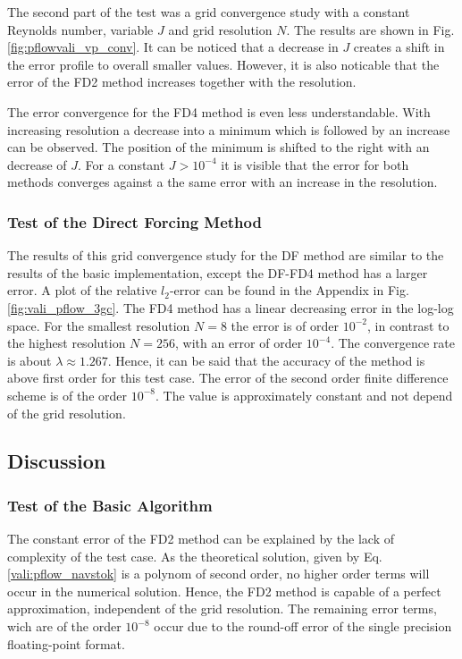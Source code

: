 The second part of the test was a grid convergence study with a constant Reynolds number, variable $J$ and grid resolution $N$.
The results are shown in Fig. \ref{fig:pflowvali_vp_conv}.
It can be noticed that a decrease in $J$ creates a shift in the error profile to overall smaller values.
However, it is also noticable that the error of the FD2 method increases together with the resolution.

The error convergence for the FD4 method is even less understandable.
With increasing resolution  a decrease into a minimum which is followed by an increase can be observed.
The position of the minimum is shifted to the right with an decrease of $J$.
For a constant $J>10^{-4}$ it is visible that the error for both methods converges against a
the same error  with an increase in the resolution.

\clearpage

\subsubsection{Test of the Direct Forcing Method}

The results of this grid convergence study for the DF method
are similar to the results of the basic implementation, except the DF-FD4 method has a larger error.
A plot of the relative $l_2$-error can be found in the Appendix in Fig.\ref{fig:vali_pflow_3gc}.
The FD4 method has a linear decreasing error in the log-log space.
For the smallest resolution $N=8$ the error is of order $10^{-2}$,
in contrast to the highest resolution $N=256$, with an error of order $10^{-4}$.
The convergence rate is about $\lambda\approx1.267$.
Hence, it can be said that the accuracy of the method is above first order for this test case.
The error of the second order finite difference scheme is of the order $10^{-8}$.
The value is approximately constant and not depend of the grid resolution.

\subsection{Discussion}
\subsubsection{Test of the Basic Algorithm}

The constant error of the FD2 method can be explained by the lack of complexity of the test case.
As the theoretical solution, given by Eq. \ref{vali:pflow_navstok} is a polynom of second order,
no higher order terms will occur in the numerical solution.
Hence, the FD2 method is capable of a perfect approximation, independent of the
grid resolution. The remaining error terms, wich are of the order $10^{-8}$
occur due to the round-off error of the single precision floating-point format.

